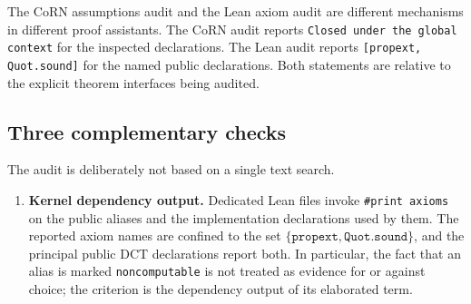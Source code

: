 \documentclass[11pt]{article}
\theoremstyle{definition}
\theoremstyle{remark}
\begin{document}
The CoRN assumptions audit and the Lean axiom audit are different mechanisms in different proof assistants.  The CoRN audit reports \texttt{Closed under the global context} for the inspected declarations.  The Lean audit reports \texttt{[propext, Quot.sound]} for the named public declarations.  Both statements are relative to the explicit theorem interfaces being audited.

\subsection*{Three complementary checks}
The audit is deliberately not based on a single text search.
\begin{enumerate}[label=(\arabic*)]
\item \textbf{Kernel dependency output.}  Dedicated Lean files invoke \texttt{\#print axioms} on the public aliases and the implementation declarations used by them.  The reported axiom names are confined to the set \(\{\texttt{propext},\texttt{Quot.sound}\}\), and the principal public DCT declarations report both.  In particular, the fact that an alias is marked \texttt{noncomputable} is not treated as evidence for or against choice; the criterion is the dependency output of its elaborated term.


\end{enumerate}
\end{document}
